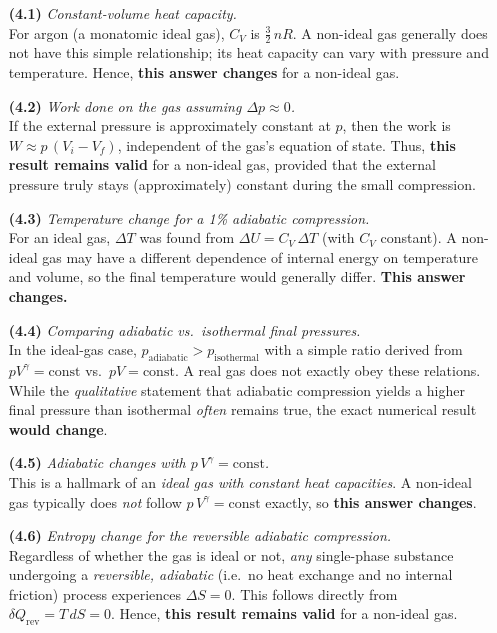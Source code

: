 \documentclass[12pt]{article}
\theoremstyle{definition} %
\theoremstyle{plain} %
\begin{document}
\begin{enumerate}
\item[\textbf{(4.1)}]
\emph{Constant-volume heat capacity.} \\
For argon (a monatomic ideal gas), $C_V$ is $\tfrac{3}{2}\,nR$. A non-ideal gas generally does not have this simple relationship; its heat capacity can vary with pressure and temperature. Hence, \textbf{this answer changes} for a non-ideal gas.

\item[\textbf{(4.2)}]
\emph{Work done on the gas assuming $\Delta p \approx 0$.} \\
If the external pressure is approximately constant at $p$, then the work is $W \approx p\,(V_i - V_f)$, independent of the gas’s equation of state. Thus, \textbf{this result remains valid} for a non-ideal gas, provided that the external pressure truly stays (approximately) constant during the small compression.

\item[\textbf{(4.3)}]
\emph{Temperature change for a 1\% adiabatic compression.} \\
For an ideal gas, $\Delta T$ was found from $\Delta U = C_V\,\Delta T$ (with $C_V$ constant). A non-ideal gas may have a different dependence of internal energy on temperature and volume, so the final temperature would generally differ. \textbf{This answer changes.}

\item[\textbf{(4.4)}]
\emph{Comparing adiabatic vs.\ isothermal final pressures.} \\
In the ideal-gas case, $p_{\text{adiabatic}} > p_{\text{isothermal}}$ with a simple ratio derived from $pV^\gamma=\mathrm{const}$ vs.\ $pV=\mathrm{const}$. A real gas does not exactly obey these relations. While the \emph{qualitative} statement that adiabatic compression yields a higher final pressure than isothermal \emph{often} remains true, the exact numerical result \textbf{would change}.

\item[\textbf{(4.5)}]
\emph{Adiabatic changes with $p\,V^\gamma = \mathrm{const}$.} \\
This is a hallmark of an \emph{ideal gas with constant heat capacities}. A non-ideal gas typically does \emph{not} follow $p\,V^\gamma=\mathrm{const}$ exactly, so \textbf{this answer changes}.

\item[\textbf{(4.6)}]
\emph{Entropy change for the reversible adiabatic compression.} \\
Regardless of whether the gas is ideal or not, \emph{any} single-phase substance undergoing a \emph{reversible, adiabatic} (i.e.\ no heat exchange and no internal friction) process experiences \(\Delta S=0\). This follows directly from $\delta Q_{\text{rev}}=T\,dS=0$. Hence, \textbf{this result remains valid} for a non-ideal gas.
\end{enumerate}
\end{document}
